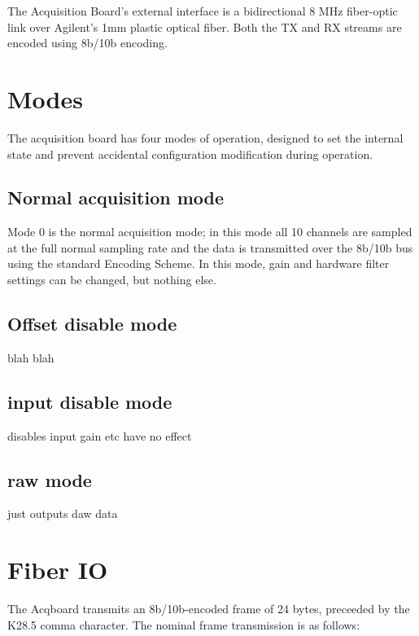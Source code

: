 

The Acquisition Board's external interface is a bidirectional 8 MHz fiber-optic link over Agilent's 1mm plastic optical fiber. Both the TX and RX streams are encoded using 8b/10b encoding. 

\section{Modes}
The acquisition board has four modes of operation, designed to set the internal state and prevent accidental configuration modification during operation. 

\subsection{Normal acquisition mode}
Mode 0 is the normal acquisition mode; in this mode all 10 channels are sampled at the full normal sampling rate and the data is transmitted over the 8b/10b bus using the standard Encoding Scheme. In this mode, gain and hardware filter settings can be changed, but nothing else. 

\subsection{Offset disable mode}
blah blah

\subsection{input disable mode}
disables input
gain etc have no effect

\subsection{raw mode}
just outputs daw data


\section{Fiber IO}
The Acqboard transmits an 8b/10b-encoded frame of 24 bytes, preceeded by the K28.5 comma character. The nominal frame transmission is as follows:

